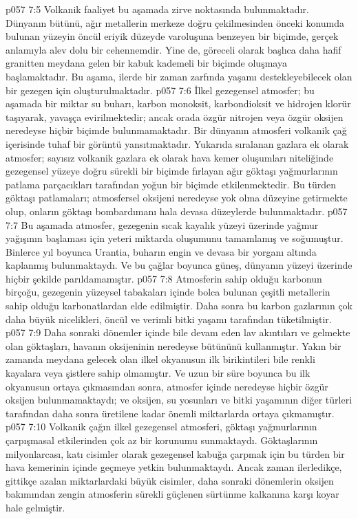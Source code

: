 \vs p057 7:5 Volkanik faaliyet bu aşamada zirve noktasında bulunmaktadır. Dünyanın bütünü, ağır metallerin merkeze doğru çekilmesinden önceki konumda bulunan yüzeyin öncül eriyik düzeyde varoluşuna benzeyen bir biçimde, gerçek anlamıyla alev dolu bir cehennemdir.  Yine de, göreceli olarak başlıca daha hafif granitten meydana gelen bir kabuk kademeli bir biçimde oluşmaya başlamaktadır. Bu aşama, ilerde bir zaman zarfında yaşamı destekleyebilecek olan bir gezegen için oluşturulmaktadır.
\vs p057 7:6 İlkel gezegensel atmosfer; bu aşamada bir miktar su buharı, karbon monoksit, karbondioksit ve hidrojen klorür taşıyarak, yavaşça evirilmektedir; ancak orada özgür nitrojen veya özgür oksijen neredeyse hiçbir biçimde bulunmamaktadır. Bir dünyanın atmosferi volkanik çağ içerisinde tuhaf bir görüntü yansıtmaktadır. Yukarıda sıralanan gazlara ek olarak atmosfer; sayısız volkanik gazlara ek olarak hava kemer oluşumları niteliğinde gezegensel yüzeye doğru sürekli bir biçimde fırlayan ağır göktaşı yağmurlarının patlama parçacıkları tarafından yoğun bir biçimde etkilenmektedir. Bu türden göktaşı patlamaları; atmosfersel oksijeni neredeyse yok olma düzeyine getirmekte olup, onların göktaşı bombardımanı hala devasa düzeylerde bulunmaktadır.
\vs p057 7:7 Bu aşamada atmosfer, gezegenin sıcak kayalık yüzeyi üzerinde yağmur yağışının başlaması için yeteri miktarda oluşumunu tamamlamış ve soğumuştur. Binlerce yıl boyunca Urantia, buharın engin ve devasa bir yorganı altında kaplanmış bulunmaktaydı. Ve bu çağlar boyunca güneş, dünyanın yüzeyi üzerinde hiçbir şekilde parıldamamıştır.
\vs p057 7:8 Atmosferin sahip olduğu karbonun birçoğu, gezegenin yüzeysel tabakaları içinde bolca bulunan çeşitli metallerin sahip olduğu karbonatlardan elde edilmiştir. Daha sonra bu karbon gazlarının çok daha büyük nicelikleri, öncül ve verimli bitki yaşamı tarafından tüketilmiştir.
\vs p057 7:9 Daha sonraki dönemler içinde bile devam eden lav akıntıları ve gelmekte olan göktaşları, havanın oksijeninin neredeyse bütününü kullanmıştır. Yakın bir zamanda meydana gelecek olan ilkel okyanusun ilk birikintileri bile renkli kayalara veya şistlere sahip olmamıştır. Ve uzun bir süre boyunca bu ilk okyanusun ortaya çıkmasından sonra, atmosfer içinde neredeyse hiçbir özgür oksijen bulunmamaktaydı; ve oksijen, su yosunları ve bitki yaşamının diğer türleri tarafından daha sonra üretilene kadar önemli miktarlarda ortaya çıkmamıştır.
\vs p057 7:10 Volkanik çağın ilkel gezegensel atmosferi, göktaşı yağmurlarının çarpışmasal etkilerinden çok az bir korunumu sunmaktaydı. Göktaşlarının milyonlarcası, katı cisimler olarak gezegensel kabuğa çarpmak için bu türden bir hava kemerinin içinde geçmeye yetkin bulunmaktaydı. Ancak zaman ilerledikçe, gittikçe azalan miktarlardaki büyük cisimler, daha sonraki dönemlerin oksijen bakımından zengin atmosferin sürekli güçlenen sürtünme kalkanına karşı koyar hale gelmiştir.

